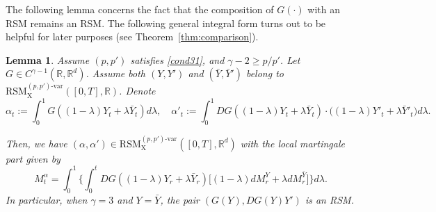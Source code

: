 \documentclass[11pt,reqno]{amsart}
\newtheorem{lemma}{Lemma}[section]
\numberwithin{equation}{section}
\def\R{\mathbb R}
\begin{document}
The following lemma concerns the fact that the composition of $G(\bm\cdot)$ with an RSM remains an RSM. The following general integral form turns out to be helpful for later purposes (see Theorem~\ref{thm:comparison}).

\begin{lemma}\label{lem:int of RSM}
Assume $(p,p')$ satisfies \eqref{cond31}, and $\gamma - 2\ge p/p'$. Let $G \in C^{\gamma - 1}(\R,\R^d)$. Assume both $(Y,Y')$ and $(\bar Y,\bar Y')$ belong to $ \mathrm{RSM}^{(p,p')\text{-}\mathrm{var}}_{\mathrm X}([0,T],\R)$. Denote  
\begin{equation}\label{e:def of alpha}
\alpha_t := \int_{0}^{1}G( (1-\lambda) Y_t + \lambda\bar Y_t) d\lambda,\quad \alpha'_t := \int_{0}^{1} DG( (1-\lambda) Y_t + \lambda\bar Y_t) \cdot \big( (1-\lambda)Y'_{t} + \lambda \bar Y'_{t} \big) d\lambda.
\end{equation}

Then, we have $(\alpha,\alpha') \in \mathrm{RSM}^{(p,p')\text{-}\mathrm{var}}_{\mathrm X}([0,T],\R^d)$ with  the local martingale part given by 
\begin{equation}\label{e:rep of M^alpha}
M^{\alpha}_{t} = \int_{0}^{1} \Big\{\int_{0}^{t} DG( (1-\lambda) Y_r + \lambda\bar Y_r) \big[(1 - \lambda)dM_r^{Y} + \lambda dM^{\bar Y}_r\big] \Big\} d\lambda.
\end{equation}
In particular, when $\gamma = 3$ and $Y=\bar Y$, the pair $(G(Y), D G(Y)Y')$ is an \textrm{RSM}.


\end{lemma}
\end{document}
